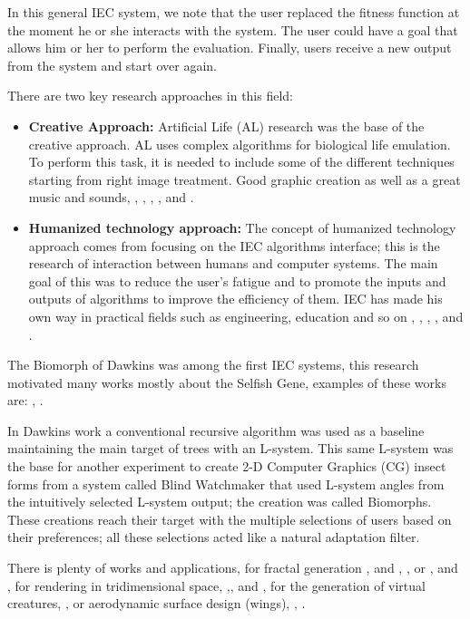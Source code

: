 In this general IEC system, we note that the user replaced the fitness function
at the moment he or she interacts with the system. The user could have a goal
that allows him or her to perform the evaluation. Finally, users receive a new
output from the system and start over again.

There are two key research approaches in this field:

\begin{itemize} \item \textbf{Creative Approach:} Artificial Life (AL) research
was the base of the creative approach. AL uses complex algorithms for biological
life emulation. To perform this task, it is needed to include some of the
different techniques starting from right image treatment. Good graphic creation
as well as a great music and sounds, \cite{sims1991artificial},
\cite{sims1994evolving}, \cite{dawkins1986blind}, \cite{disz1997ubiworld},
\cite{unemi2000sbart}and \cite{unemi2003sbeat3}. \item \textbf{Humanized
technology approach:} The concept of humanized technology approach comes from
focusing on the IEC algorithms interface; this is the research of interaction
between humans and computer systems. The main goal of this was to reduce the
user's fatigue and to promote the inputs and outputs of algorithms to improve
the efficiency of them. IEC has made his own way in practical fields such as
engineering, education and so on \cite{parmee1993concrete},
\cite{ventrella1994explorations}, \cite{takagi1996discrete},
\cite{poli1997genetic}, \cite{parmee1998genetic} and
\cite{takagi1998interactive}. \end{itemize}

The Biomorph of Dawkins was among the first IEC systems,
this research motivated many works mostly about the Selfish Gene, examples
of these works are: \cite{ochoa1998genetic},
\cite{mccormack1993interactive}.

In Dawkins work a conventional recursive algorithm was used as a baseline
maintaining the main target of trees with an L-system. This same L-system was
the base for another experiment to create 2-D Computer Graphics (CG) insect
forms from a system called Blind Watchmaker that used L-system angles from the
intuitively selected L-system output; the creation was called Biomorphs. These
creations reach their target with the multiple selections of users based on
their preferences; all these selections acted like a natural adaptation filter.

There is plenty of works and applications, for fractal generation
\cite{sims1992interactive}, \cite{baluja1993simulating} and
\cite{baluja1994towards}, \cite{lund1995artistic}, or
\cite{angeline1996evolving},\cite{raynal1999manipulation} and \cite{lutton2003artie},
for rendering in tridimensional space,
\cite{todd1992artificial},\cite{broughton1997use}, \cite{das1994genetic} and \cite{tam2002genetic}, for the generation of virtual creatures,
\cite{rowland2000evolutionary}, or aerodynamic surface design (wings),
\cite{nguyen1993evolvable}, \cite{nguyen1994evolvable}.

